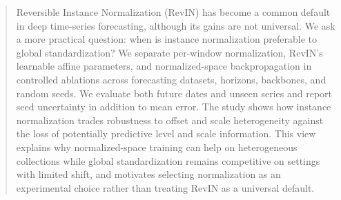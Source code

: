 \begin{abstract}
Reversible Instance Normalization (RevIN) has become a common default in deep
time-series forecasting, although its gains are not universal. We ask a more
practical question: when is instance normalization preferable to global
standardization? We separate per-window normalization, RevIN's learnable affine
parameters, and normalized-space backpropagation in controlled ablations across
forecasting datasets, horizons, backbones, and random seeds. We evaluate both
future dates and unseen series and report seed uncertainty in addition to mean
error. The study shows how instance normalization trades robustness to offset
and scale heterogeneity against the loss of potentially predictive level and
scale information. This view explains why normalized-space training can help
on heterogeneous collections while global standardization remains competitive
on settings with limited shift, and motivates selecting normalization as an
experimental choice rather than treating RevIN as a universal default.

\end{abstract}
